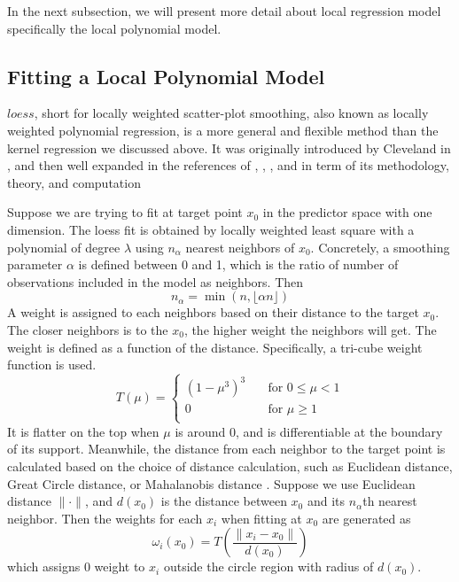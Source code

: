 In the next subsection, we will present more detail
about local regression model specifically the local polynomial model.

\subsection{Fitting a Local Polynomial Model}
\label{sec:loess}

$loess$, short for locally weighted scatter-plot smoothing, also known as locally
weighted polynomial regression, is a more general and flexible
method than the kernel regression we discussed above. It was originally introduced 
by Cleveland in \cite{Cleveland:1979}, and then well expanded in the references 
of \cite{cleveland1988locally}, \cite{cleveland1991computational}, 
\cite{cleveland1988regression}, and \cite{cleveland1996smoothing} in term of its
methodology, theory, and computation

Suppose we are trying to fit at target point $x_0$ in the predictor space with
one dimension. The loess fit is obtained by locally weighted least square with a
polynomial of degree $\lambda$ using $n_{\alpha}$ nearest neighbors of $x_0$. 
Concretely, a smoothing parameter $\alpha$ is defined between 0 and 1, which is
the ratio of number of observations included in the model as neighbors. Then 
\begin{equation} 
n_{\alpha} = \min(n, \lfloor \alpha n \rfloor)
\end{equation}
A weight is assigned to each neighbors based on their distance to the target $x_0$.
The closer neighbors is to the $x_0$, the higher weight the neighbors will get. The
weight is defined as a function of the distance. Specifically, a tri-cube weight 
function is used.
\begin{equation} 
\label{tricube}
T(\mu) =
  \begin{cases}
    (1 - \mu^3)^3       & \quad \text{for } 0 \le \mu < 1\\
    0  & \quad \text{for } \mu \ge 1\\
  \end{cases}
\end{equation}
It is flatter on the top when $\mu$ is around 0, and is differentiable at the 
boundary of its support.
Meanwhile, the distance from each neighbor to the target point is calculated 
based on the choice of distance calculation, such as Euclidean distance, Great 
Circle distance, or Mahalanobis distance \cite{mahalanobis1936}. 
Suppose we use Euclidean distance $\|\cdot\|$, and $d(x_0)$ is the distance 
between $x_0$ and its $n_{\alpha}$th nearest neighbor.
Then the weights for each $x_i$ when fitting at $x_0$ are generated as
\begin{equation} 
\omega_i(x_0) = T \left( \frac{\| x_i - x_0 \|}{d(x_0)} \right)
\end{equation}
which assigns 0 weight to $x_i$ outside the circle region with radius of $d(x_0)$.


